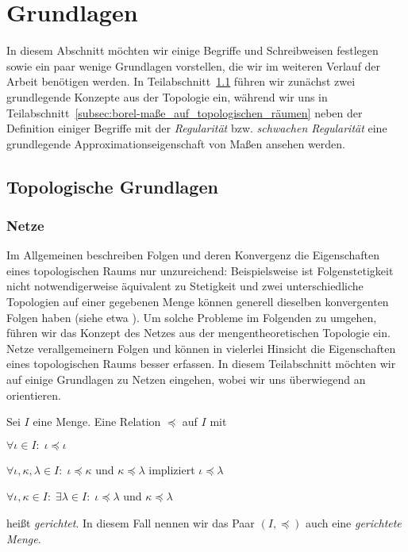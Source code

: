 \documentclass[../main/main.tex]{subfiles}
\begin{document}
	
	\section{Grundlagen}
	
	In diesem Abschnitt möchten wir einige Begriffe und Schreibweisen festlegen sowie ein paar wenige Grundlagen vorstellen, 
	die wir im weiteren Verlauf der Arbeit benötigen werden. 
	In Teilabschnitt~\ref{subsec:topologische_grundlagen} führen wir zunächst zwei grundlegende Konzepte aus der Topologie ein, während wir
	uns in Teilabschnitt~\ref{subsec:borel-maße_auf_topologischen_räumen} neben der Definition einiger Begriffe mit der 
	\emph{Regularität} bzw. \emph{schwachen Regularität} eine grundlegende Approximationseigenschaft von Maßen ansehen werden.
	
	\subsection{Topologische Grundlagen}
	\label{subsec:topologische_grundlagen}
	
	\subsubsection*{Netze}
	
	Im Allgemeinen beschreiben Folgen und deren Konvergenz die Eigenschaften eines topologischen Raums nur unzureichend:
	Beispielsweise ist Folgenstetigkeit nicht notwendigerweise äquivalent zu Stetigkeit und zwei unterschiedliche Topologien auf einer 
	gegebenen Menge können generell dieselben konvergenten Folgen haben (siehe etwa \cite[Beispiel 2.6.1]{Simon.2015}). 
	Um solche Probleme im Folgenden zu umgehen, führen wir das
	Konzept des Netzes aus der mengentheoretischen Topologie ein. Netze verallgemeinern Folgen und können in vielerlei Hinsicht die 
	Eigenschaften eines topologischen Raums besser erfassen. In diesem Teilabschnitt möchten wir auf einige Grundlagen zu Netzen eingehen,
	wobei wir uns überwiegend an \cite[Kapitel 2.6]{Simon.2015} orientieren.
	
	\begin{Definition}
		\label{def:gerichtete_menge}
		Sei $I$ eine Menge. Eine Relation $\preceq$ auf $I$ mit
		\begin{enumeratethm}
			\item $\forall \iota \in I: \; \iota \preceq \iota$
			\item $\forall \iota, \kappa, \lambda \in I: \; \iota \preceq \kappa$ und $\kappa \preceq \lambda$ impliziert $\iota \preceq \lambda$
			\item $\forall \iota, \kappa \in I: \; \exists \lambda \in I: \; \iota \preceq \lambda$ und $\kappa \preceq \lambda$
		\end{enumeratethm}
		heißt \emph{gerichtet}. In diesem Fall nennen wir das Paar $(I, \preceq)$ auch eine \emph{gerichtete Menge}.
	\end{Definition}
	
\end{document}
